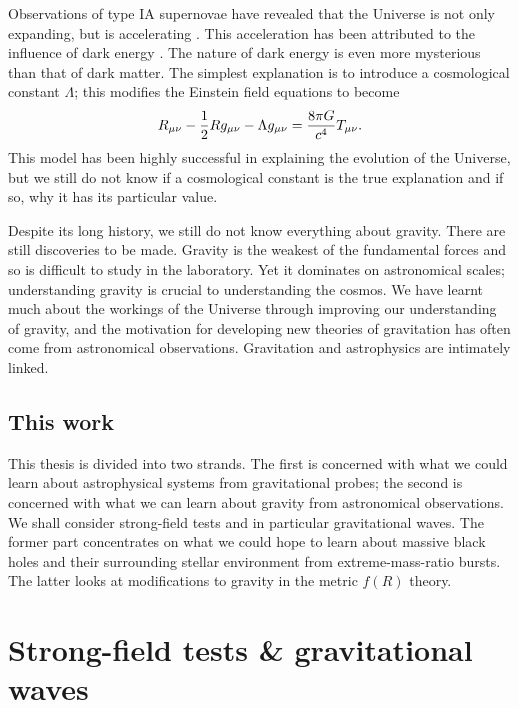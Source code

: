 {Observations of type IA supernovae have revealed that the Universe is not only expanding, but is accelerating \citep{Riess1998,Perlmutter1999}. This acceleration has been attributed to the influence of dark energy \citep{Perlmutter1999a,Peebles2003}. The nature of dark energy is even more mysterious than that of dark matter. The simplest explanation is to introduce a cosmological constant $\Lambda$; this modifies the Einstein field equations to become \citep[document 43]{Einstein1997}
\begin{equation}
R_{\mu\nu} - \frac{1}{2}R g_{\mu\nu} - \Lambda g_{\mu\nu} = \frac{8\pi G}{c^4}T_{\mu\nu}.
\end{equation}
This model has been highly successful in explaining the evolution of the Universe, but we still do not know if a cosmological constant is the true explanation and if so, why it has its particular value.

Despite its long history, we still do not know everything about gravity. There are still discoveries to be made. Gravity is the weakest of the fundamental forces and so is difficult to study in the laboratory. Yet it dominates on astronomical scales; understanding gravity is crucial to understanding the cosmos. We have learnt much about the workings of the Universe through improving our understanding of gravity, and the motivation for developing new theories of gravitation has often come from astronomical observations. Gravitation and astrophysics are intimately linked.

\subsection{This work}

This thesis is divided into two strands. The first is concerned with what we could learn about astrophysical systems from gravitational probes; the second is concerned with what we can learn about gravity from astronomical observations.  We shall consider strong-field tests and in particular gravitational waves. The former part concentrates on what we could hope to learn about massive black holes and their surrounding stellar environment from extreme-mass-ratio bursts. The latter looks at modifications to gravity in the metric $f(R)$ theory.

\section{Strong-field tests \& gravitational waves}

}
